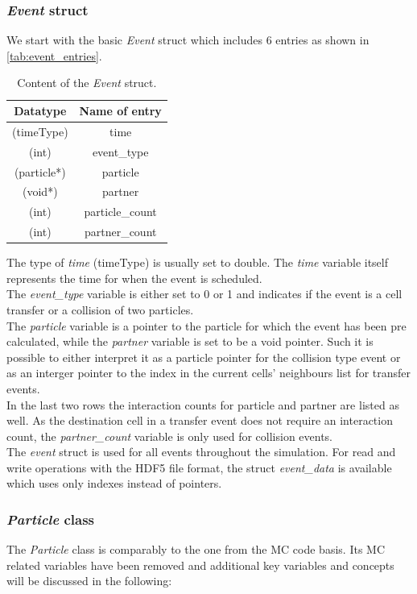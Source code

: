 \subsubsection{\textit{Event} struct}
\label{sec:event_struct}
We start with the basic \textit{Event} struct which includes 6 entries as shown in \autoref{tab:event_entries}.
\begin{table}[h!]
\centering
\begin{tabular}{c|c}
\textbf{Datatype} & \textbf{Name of entry}\\ \hline
(timeType) & time \\
(int) & event\_type \\
(particle*)  & particle \\
(void*) & partner \\
(int) & particle\_count \\
(int) & partner\_count \\
\end{tabular}
\caption{Content of the \textit{Event} struct.}
\label{tab:event_entries}
\end{table}
The type of \textit{time} (timeType) is usually set to double. The \textit{time} variable itself represents the time for when the event is scheduled.\\ 
The \textit{event\_type} variable is either set to 0 or 1 and indicates if the event is a cell transfer or a collision of two particles.\\
The \textit{particle} variable is a pointer to the particle for which the event has been pre calculated, while the \textit{partner} variable is set to be a void pointer. Such it is possible to either interpret it as a particle pointer for the collision type event or as an interger pointer to the index in the current cells' neighbours list for transfer events.\\
In the last two rows the interaction counts for particle and partner are listed as well. As the destination cell in a transfer event does not require an interaction count, the \textit{partner\_count} variable is only used for collision events.\\

The \textit{event} struct is used for all events throughout the simulation. For read and write operations with the HDF5 file format, the struct \textit{event\_data} is available which uses only indexes instead of pointers.\\

\subsubsection{\textit{Particle} class}
\label{sec:particle_class}
The \textit{Particle} class is comparably to the one from the MC code basis. Its MC related variables have been removed and additional key variables and concepts will be discussed in the following:\\

